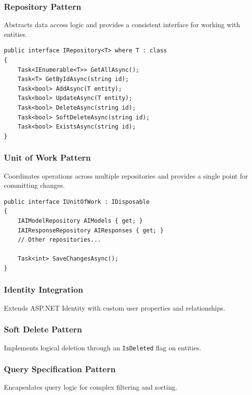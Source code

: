 \subsubsection*{Repository Pattern}

Abstracts data access logic and provides a consistent interface for working with entities.

\begin{verbatim}
public interface IRepository<T> where T : class
{
    Task<IEnumerable<T>> GetAllAsync();
    Task<T> GetByIdAsync(string id);
    Task<bool> AddAsync(T entity);
    Task<bool> UpdateAsync(T entity);
    Task<bool> DeleteAsync(string id);
    Task<bool> SoftDeleteAsync(string id);
    Task<bool> ExistsAsync(string id);
}
\end{verbatim}

\subsubsection*{Unit of Work Pattern}

Coordinates operations across multiple repositories and provides a single point for committing changes.

\begin{verbatim}
public interface IUnitOfWork : IDisposable
{
    IAIModelRepository AIModels { get; }
    IAIResponseRepository AIResponses { get; }
    // Other repositories...
    
    Task<int> SaveChangesAsync();
}
\end{verbatim}

\subsubsection*{Identity Integration}

Extends ASP.NET Identity with custom user properties and relationships.

\subsubsection*{Soft Delete Pattern}

Implements logical deletion through an \texttt{IsDeleted} flag on entities.

\subsubsection*{Query Specification Pattern}

Encapsulates query logic for complex filtering and sorting.

